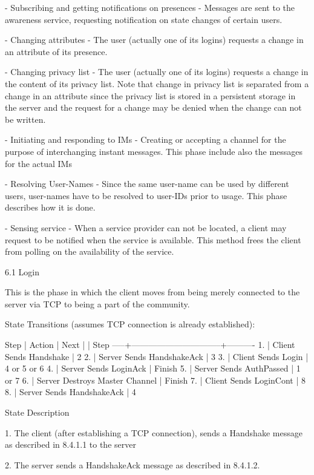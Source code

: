 \documentclass[titlepage,oneside]{book}
\begin{document}
- Subscribing and getting notifications on presences - Messages are
sent to the awareness service, requesting notification on state changes
of certain users.

- Changing attributes - The user (actually one of its logins) requests
a change in an attribute of its presence.

- Changing privacy list - The user (actually one of its logins)
requests a change in the content of its privacy list. Note that change
in privacy list is separated from a change in an attribute since the
privacy list is stored in a persistent storage in the server and the
request for a change may be denied when the change can not be written.

- Initiating and responding to IMs - Creating or accepting a channel
for the purpose of interchanging instant messages. This phase include
also the messages for the actual IMs

- Resolving User-Names - Since the same user-name can be used by
different users, user-names have to be resolved to user-IDs prior to
usage. This phase describes how it is done.

- Sensing service - When a service provider can not be located, a
client may request to be notified when the service is available. This
method frees the client from polling on the availability of the
service.

6.1 Login

This is the phase in which the client moves from being merely connected
to the server via TCP to being a part of the community.

State Transitions (assumes TCP connection is already established):

Step | Action                         |  Next
     |                                |  Step
-----+--------------------------------+----------
1.   | Client Sends Handshake         |  2
2.   | Server Sends HandshakeAck      |  3
3.   | Client Sends Login             |  4 or 5 or 6
4.   | Server Sends LoginAck          |  Finish
5.   | Server Sends AuthPassed        |  1 or 7
6.   | Server Destroys Master Channel |  Finish
7.   | Client Sends LoginCont         |  8
8.   | Server Sends HandshakeAck      |  4

State Description

1. The client (after establishing a TCP connection), sends a Handshake
message as described in 8.4.1.1 to the server

2. The server sends a HandshakeAck message as described in
8.4.1.2.
\end{document}
